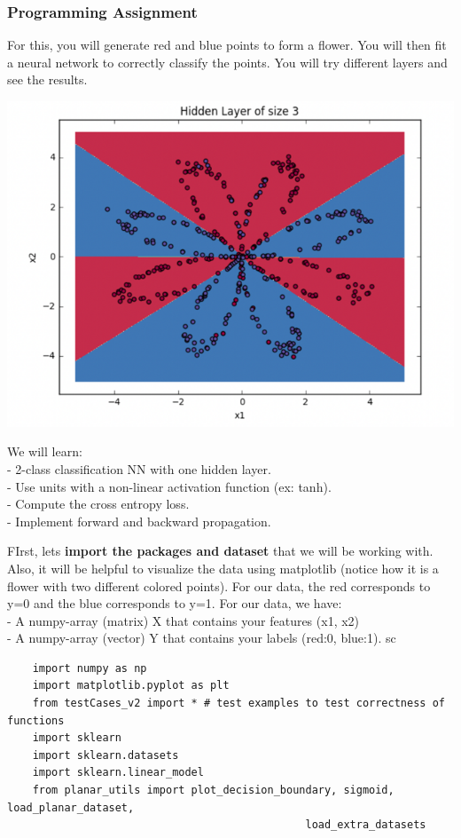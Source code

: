 \documentclass[11pt, a4paper]{article}
\begin{document}
\begin{spacing}{1.1}
	\subsubsection{Programming Assignment}
	For this, you will generate red and blue points to form a flower. You will then fit a neural network to correctly classify the points. You will try different layers and see the results. \vspace*{.5mm} \\
	\begin{minipage}[c]{6.5cm}
	\vspace*{1mm} \includegraphics[scale=0.57]{planar} 
	\end{minipage}
	\begin{minipage}[c]{10cm}
	We will learn: \\
	- 2-class classification NN with one hidden layer. \\
	- Use units with a non-linear activation function (ex: tanh). \\
	- Compute the cross entropy loss. \\
	- Implement forward and backward propagation.
	\end{minipage} \newpage

	\noindent FIrst, lets \textbf{import the packages and dataset} that we will be working with. Also, it will be helpful to visualize the data using matplotlib (notice how it is a flower with two different colored points). For our data, the red corresponds to y=0 and the blue corresponds to y=1. For our data, we have: \\
	\hspace*{3mm} - A numpy-array (matrix) X that contains your features (x1, x2) \\
	\hspace*{3mm} - A numpy-array (vector) Y that contains your labels (red:0, blue:1). sc
	\begin{lstlisting}
	import numpy as np
	import matplotlib.pyplot as plt
	from testCases_v2 import * # test examples to test correctness of functions
	import sklearn
	import sklearn.datasets
	import sklearn.linear_model
	from planar_utils import plot_decision_boundary, sigmoid, load_planar_dataset, 
										       load_extra_datasets


\end{lstlisting}
\end{spacing}
\end{document}
